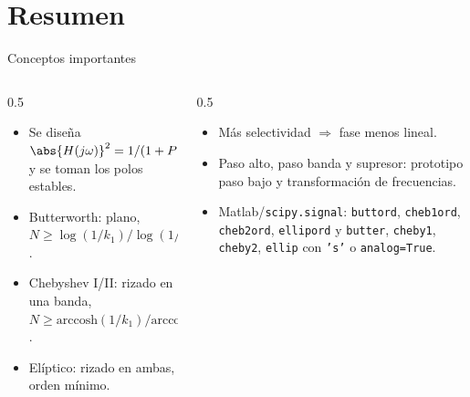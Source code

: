 \documentclass[aspectratio=169,11pt]{beamer}
\begin{document}
\section*{Resumen}
\begin{frame}{Conceptos importantes}
  \begin{columns}[T]
    \begin{column}{0.5\textwidth}
      \begin{itemize}
        \item Se diseña $\abs{H(j\omega)}^2=1/(1+P(\omega^2))$ y se toman los polos estables.
        \item Butterworth: plano, $N\ge\log(1/k_1)/\log(1/k)$.
        \item Chebyshev I/II: rizado en una banda, $N\ge\mathrm{arccosh}(1/k_1)/\mathrm{arccosh}(1/k)$.
        \item Elíptico: rizado en ambas, orden mínimo.
      \end{itemize}
    \end{column}
    \begin{column}{0.5\textwidth}
      \begin{itemize}
        \item Más selectividad $\Rightarrow$ fase menos lineal.
        \item Paso alto, paso banda y supresor: prototipo paso bajo y transformación de frecuencias.
        \item Matlab/\texttt{scipy.signal}: \texttt{buttord}, \texttt{cheb1ord}, \texttt{cheb2ord}, \texttt{ellipord} y \texttt{butter}, \texttt{cheby1}, \texttt{cheby2}, \texttt{ellip} con \texttt{'s'} o \texttt{analog=True}.
      \end{itemize}
    \end{column}
  \end{columns}
  \bigskip
\end{frame}
\end{document}
